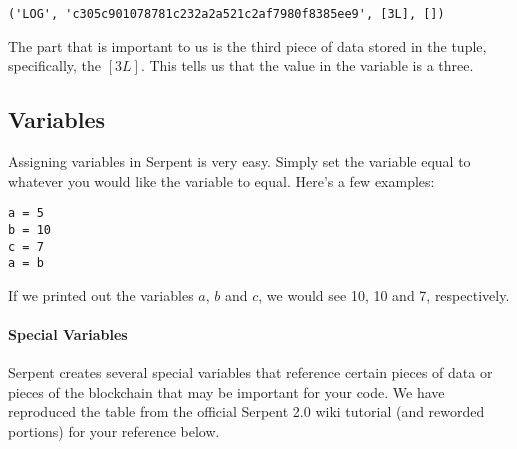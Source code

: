 \documentclass[12pt]{article}
\begin{document}
\begin{verbatim}
('LOG', 'c305c901078781c232a2a521c2af7980f8385ee9', [3L], [])
\end{verbatim}

The part that is important to us is the third piece of data stored in the tuple, specifically, the $[3L]$. This tells us that the value in the variable is a three.

\subsection{Variables}

Assigning variables in Serpent is very easy. Simply set the variable equal to whatever you would like the variable to equal. Here's a few examples:

\begin{verbatim}
a = 5
b = 10
c = 7
a = b
\end{verbatim}

If we printed out the variables $a$, $b$ and $c$, we would see 10, 10 and 7, respectively. 

\paragraph{Special Variables}

Serpent creates several special variables that reference certain pieces of data or pieces of the blockchain that may be important for your code. We have reproduced the table from the official Serpent 2.0 wiki tutorial (and reworded portions) for your reference below. \cite{Serpent}
\end{document}
